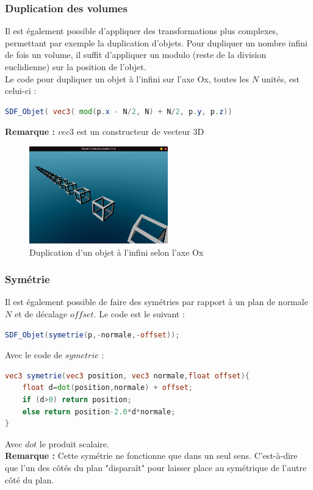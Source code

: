 \subsubsection{Duplication des volumes}
Il est également possible d'appliquer des transformations plus complexes, permettant par exemple la duplication d'objets. Pour dupliquer un nombre infini de fois un volume, il suffit d'appliquer un modulo (reste de la division euclidienne) sur la position de l'objet.
\\Le code pour dupliquer un objet à l'infini sur l'axe Ox, toutes les $N$ unités, est celui-ci :
\begin{lstlisting}[language=GLSL]
SDF_Objet( vec3( mod(p.x - N/2, N) + N/2, p.y, p.z))
\end{lstlisting}
\textbf{Remarque :} $vec3$ est un constructeur de vecteur 3D
\begin{figure}[h]
    \centering
    \includegraphics[width=6cm]{images/screens/infinite.png}
    \caption{Duplication d'un objet à l'infini selon l'axe Ox}
    \label{fig:infinite}
\end{figure}

\subsubsection{Symétrie}
Il est également possible de faire des symétries par rapport à un plan de normale $N$ et de décalage $offset$. Le code est le suivant :
\begin{lstlisting}[language=GLSL]
SDF_Objet(symetrie(p,-normale,-offset));
\end{lstlisting}
Avec le code de $symetrie$ :
\begin{lstlisting}[language=GLSL]
vec3 symetrie(vec3 position, vec3 normale,float offset){
    float d=dot(position,normale) + offset;
    if (d>0) return position;
    else return position-2.0*d*normale;
}
\end{lstlisting}
Avec $dot$ le produit scalaire.
\\\textbf{Remarque :} Cette symétrie ne fonctionne que dans un seul sens. C'est-à-dire que l'un des côtés du plan "disparaît" pour laisser place au symétrique de l'autre côté du plan.